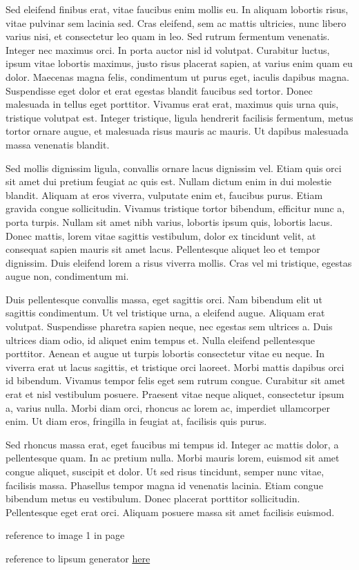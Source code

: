 \documentclass[a4paper, 12pt]{article}
\begin{document}
	Sed eleifend finibus erat, vitae faucibus enim mollis eu. In aliquam lobortis risus, vitae pulvinar sem lacinia sed. Cras eleifend, sem ac mattis ultricies, nunc libero varius nisi, et consectetur leo quam in leo. Sed rutrum fermentum venenatis. Integer nec maximus orci. In porta auctor nisl id volutpat. Curabitur luctus, ipsum vitae lobortis maximus, justo risus placerat sapien, at varius enim quam eu dolor. Maecenas magna felis, condimentum ut purus eget, iaculis dapibus magna. Suspendisse eget dolor et erat egestas blandit faucibus sed tortor. Donec malesuada in tellus eget porttitor. Vivamus erat erat, maximus quis urna quis, tristique volutpat est. Integer tristique, ligula hendrerit facilisis fermentum, metus tortor ornare augue, et malesuada risus mauris ac mauris. Ut dapibus malesuada massa venenatis blandit.
	
	Sed mollis dignissim ligula, convallis ornare lacus dignissim vel. Etiam quis orci sit amet dui pretium feugiat ac quis est. Nullam dictum enim in dui molestie blandit. Aliquam at eros viverra, vulputate enim et, faucibus purus. Etiam gravida congue sollicitudin. Vivamus tristique tortor bibendum, efficitur nunc a, porta turpis. Nullam sit amet nibh varius, lobortis ipsum quis, lobortis lacus. Donec mattis, lorem vitae sagittis vestibulum, dolor ex tincidunt velit, at consequat sapien mauris sit amet lacus. Pellentesque aliquet leo et tempor dignissim. Duis eleifend lorem a risus viverra mollis. Cras vel mi tristique, egestas augue non, condimentum mi.
	
	Duis pellentesque convallis massa, eget sagittis orci. Nam bibendum elit ut sagittis condimentum. Ut vel tristique urna, a eleifend augue. Aliquam erat volutpat. Suspendisse pharetra sapien neque, nec egestas sem ultrices a. Duis ultrices diam odio, id aliquet enim tempus et. Nulla eleifend pellentesque porttitor. Aenean et augue ut turpis lobortis consectetur vitae eu neque. In viverra erat ut lacus sagittis, et tristique orci laoreet. Morbi mattis dapibus orci id bibendum. Vivamus tempor felis eget sem rutrum congue. Curabitur sit amet erat et nisl vestibulum posuere. Praesent vitae neque aliquet, consectetur ipsum a, varius nulla. Morbi diam orci, rhoncus ac lorem ac, imperdiet ullamcorper enim. Ut diam eros, fringilla in feugiat at, facilisis quis purus.
	
	Sed rhoncus massa erat, eget faucibus mi tempus id. Integer ac mattis dolor, a pellentesque quam. In ac pretium nulla. Morbi mauris lorem, euismod sit amet congue aliquet, suscipit et dolor. Ut sed risus tincidunt, semper nunc vitae, facilisis massa. Phasellus tempor magna id venenatis lacinia. Etiam congue bibendum metus eu vestibulum. Donec placerat porttitor sollicitudin. Pellentesque eget erat orci. Aliquam posuere massa sit amet facilisis euismod.
	
	reference to image 1 in page \pageref{fig:f1}
	
	reference to lipsum generator \href{https://www.lipsum.com/}{here}
\end{document}
